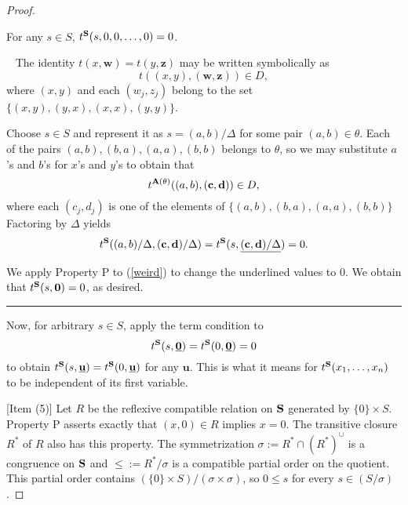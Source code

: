 \begin{proof}
\begin{clm}
  For any $s\in S$, $t^{{{\mathbf{\uppercase{s}}}}}(s,0,0,\ldots,0)=0$.
\end{clm}

{\ }
The identity $t(x,{{\mathbf{{w}}}})=t(y,{{\mathbf{{z}}}})$ may be written
symbolically as
\[t((x,y),({{\mathbf{{w}}}},{{\mathbf{{z}}}}))\in D,\]
where
$(x,y)$ and each $(w_j,z_j)$ belong to the set
$\{(x,y), (y,x), (x,x), (y,y)\}$.

Choose $s\in S$ and represent it as
$s = (a,b)/\Delta$ for some pair $(a,b)\in\theta$.
Each of the pairs $(a,b), (b,a), (a,a), (b,b)$
belongs to $\theta$, so we may substitute $a$'s and $b$'s
for $x$'s and $y$'s to obtain that
\[
t^{{{\mathbf{\uppercase{a}}}}(\theta)}((a,b),({{\mathbf{{c}}}},{{\mathbf{{d}}}}))\in D,
\]
where each $(c_j,d_j)$ is one of the elements of
$\{(a,b), (b,a), (a,a), (b,b)\}$
Factoring by $\Delta$ yields
\begin{equation}\label{weird}
t^{{{\mathbf{\uppercase{s}}}}}((a,b)/\Delta,({{\mathbf{{c}}}},{{\mathbf{{d}}}})/\Delta) = 
t^{{{\mathbf{\uppercase{s}}}}}(s,\underline{({{\mathbf{{c}}}},{{\mathbf{{d}}}})/\Delta}) = 0.
\end{equation}

We apply Property P to (\ref{weird}) to change
the underlined values to $0$. We obtain that
$t^{{{\mathbf{\uppercase{s}}}}}(s,{{\mathbf{{0}}}})=0$, as desired.
{\hfill\rule{1.3mm}{3mm}}

\bigskip

Now, for arbitrary $s\in S$, apply the term condition to
\[
t^{{{\mathbf{\uppercase{s}}}}}(s,\underline{{{\mathbf{{0}}}}}) = t^{{{\mathbf{\uppercase{s}}}}}(0,\underline{{{\mathbf{{0}}}}}) =0
\]
to obtain
$t^{{{\mathbf{\uppercase{s}}}}}(s,\underline{{{\mathbf{{u}}}}}) = t^{{{\mathbf{\uppercase{s}}}}}(0,\underline{{{\mathbf{{u}}}}})$
for any ${{\mathbf{{u}}}}$. This is what it means for $t^{{{\mathbf{\uppercase{s}}}}}(x_1,\ldots,x_n)$
to be independent of its first variable.

\bigskip

[Item (5)]
Let $R$ be the reflexive compatible relation on ${{\mathbf{\uppercase{s}}}}$
generated by $\{0\}\times S$. Property P asserts exactly that
$(x,0)\in R$ implies $x=0$. The transitive closure $R^*$ of $R$
also has this property. The symmetrization $\sigma:= R^*\cap (R^*)^{\cup}$
is a congruence on ${{\mathbf{\uppercase{s}}}}$ and $\leq := R^*/\sigma$ is a compatible
partial order on the quotient. This partial order
contains $(\{0\}\times S)/(\sigma\times\sigma)$, so
$0\leq s$ for every $s\in (S/\sigma)$.


\end{proof}

